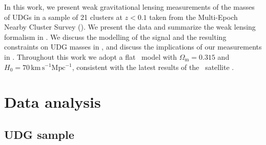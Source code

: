 \documentclass[usenatbib,fleqn]{mnras}
\begin{document}
In this work, we present weak gravitational lensing measurements of the masses of UDGs in a sample of 21 clusters at $z<0.1$ taken from the Multi-Epoch Nearby Cluster Survey (\meneacs). We present the data and summarize the weak lensing formalism in . We discuss the modelling of the signal and the resulting constraints on UDG masses in , and discuss the implications of our measurements in . Throughout this work we adopt a flat \lcdm\ model with $\Omega_\mathrm{m}=0.315$ and $H_0=70\,\mathrm{km\,s^{-1}Mpc^{-1}}$, consistent with the latest results of the \planck\ satellite \citep{planck15xiii}.

\section{Data analysis}
\label{s:data}


\subsection{UDG sample}
\end{document}
